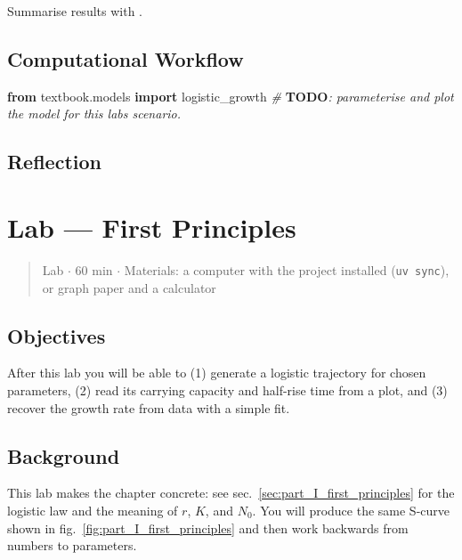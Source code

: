 \documentclass[
]{article}
\newenvironment{Shaded}{}{}
\newcommand{\AlertTok}[1]{\textcolor[rgb]{1.00,0.00,0.00}{\textbf{#1}}}
\newcommand{\CommentTok}[1]{\textcolor[rgb]{0.38,0.63,0.69}{\textit{#1}}}
\newcommand{\ImportTok}[1]{\textcolor[rgb]{0.00,0.50,0.00}{\textbf{#1}}}
\newcommand{\NormalTok}[1]{#1}
\theoremstyle{plain}
\theoremstyle{definition}
\begin{document}
Summarise results with .

\subsection{Computational Workflow}\label{computational-workflow-2}

\begin{Shaded}
\begin{Highlighting}[]
\ImportTok{from}\NormalTok{ textbook.models }\ImportTok{import}\NormalTok{ logistic\_growth}
\CommentTok{\# }\AlertTok{TODO}\CommentTok{: parameterise and plot the model for this lab\textquotesingle{}s scenario.}
\end{Highlighting}
\end{Shaded}

\subsection{Reflection}\label{reflection-2}

\newpage

\section{Lab --- First
Principles}\label{sec:lab_part_I_first_principles}

\begin{quote}
Lab \texorpdfstring{\ensuremath{\cdot}}{.} 60 min \texorpdfstring{\ensuremath{\cdot}}{.} Materials: a computer with the project installed
(\texttt{uv\ sync}), or graph paper and a calculator
\end{quote}

\subsection{Objectives}\label{objectives-3}

After this lab you will be able to (1) generate a logistic trajectory
for chosen parameters, (2) read its carrying capacity and half-rise time
from a plot, and (3) recover the growth rate from data with a simple
fit.

\subsection{Background}\label{background-3}

This lab makes the chapter concrete: see
sec.~\ref{sec:part_I_first_principles} for the logistic law and the
meaning of \(r\), \(K\), and \(N_0\). You will produce the same S-curve
shown in fig.~\ref{fig:part_I_first_principles} and then work backwards
from numbers to parameters.
\end{document}
